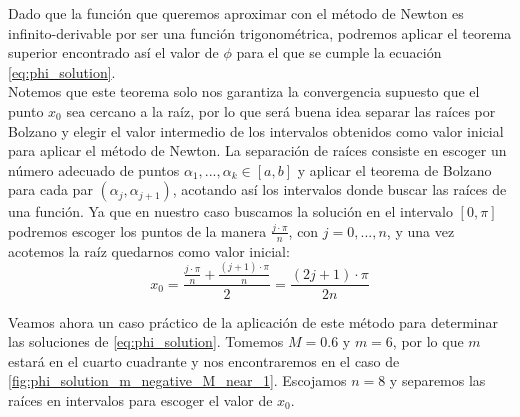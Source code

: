 \documentclass[11pt]{book}
\newcommand\ddfrac[2]{\frac{\displaystyle #1}{\displaystyle #2}}
\begin{document}
Dado que la función que queremos aproximar con el método de Newton es infinito-derivable por ser una función trigonométrica, podremos aplicar el teorema superior encontrado así el valor de $\phi$ para el que se cumple la ecuación \eqref{eq:phi_solution}.\\

Notemos que este teorema solo nos garantiza la convergencia supuesto que el punto $x_0$ sea cercano a la raíz, por lo que será buena idea separar las raíces por Bolzano y elegir el valor intermedio de los intervalos obtenidos como valor inicial para aplicar el método de Newton. La separación de raíces consiste en escoger un número adecuado de puntos $\alpha_1,...,\alpha_k\in[a,b]$ y aplicar el teorema de Bolzano para cada par $(\alpha_j,\alpha_{j+1})$, acotando así los intervalos donde buscar las raíces de una función. Ya que en nuestro caso buscamos la solución en el intervalo $[0,\pi]$ podremos escoger los puntos de la manera $\frac{j\cdot \pi}{n}$, con $j=0,...,n$, y una vez acotemos la raíz quedarnos como valor inicial:
\[
x_0=\ddfrac{\ddfrac{j\cdot\pi}{n}+\ddfrac{(j+1)\cdot\pi}{n}}{2}=\ddfrac{(2j+1)\cdot\pi}{2n}
\]

Veamos ahora un caso práctico de la aplicación de este método para determinar las soluciones de \eqref{eq:phi_solution}. Tomemos $M=0.6$ y $m=6$, por lo que $m$ estará en el cuarto cuadrante y nos encontraremos en el caso de \ref{fig:phi_solution_m_negative_M_near_1}. Escojamos $n=8$ y separemos las raíces en intervalos para escoger el valor de $x_0$.
\begin{table}[H]
\centering
{}
\end{table}
\end{document}
